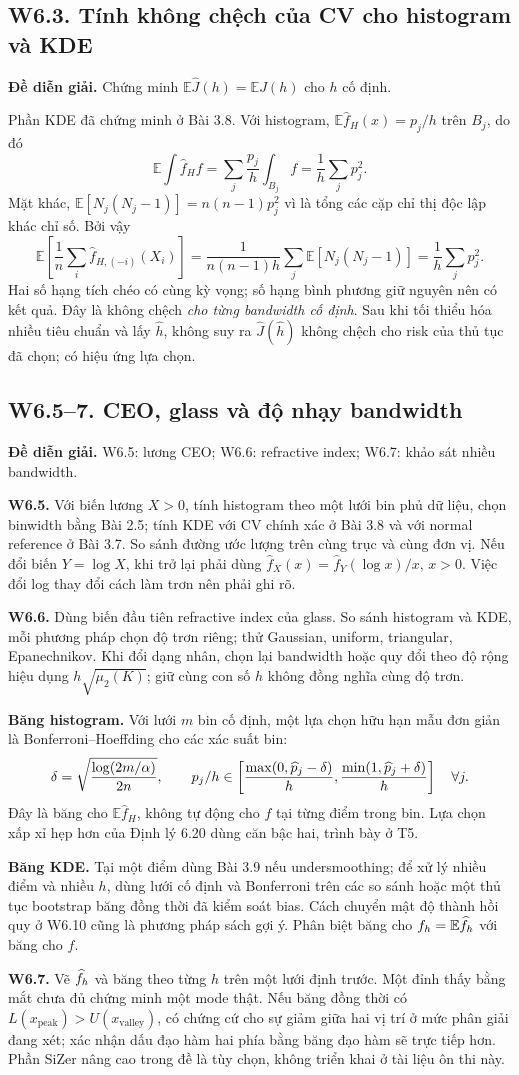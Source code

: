 \documentclass[11pt,a4paper]{article}
\newcommand{\E}{\mathbb E}\newcommand{\Pp}{\mathbb P}
\newcommand{\supp}[3]{\subsection{#1. #2}\label{s:#1}\textbf{Đề diễn giải.} #3\par}
\begin{document}
\supp{W6.3}{Tính không chệch của CV cho histogram và KDE}{Chứng minh $\E\widehat J(h)=\E J(h)$ cho $h$ cố định.}
Phần KDE đã chứng minh ở Bài 3.8. Với histogram, $\E\widehat f_H(x)=p_j/h$ trên $B_j$, do đó
\[
\E\int\widehat f_H f=\sum_j\frac{p_j}h\int_{B_j}f=\frac1h\sum_jp_j^2.
\]
Mặt khác, $\E[N_j(N_j-1)]=n(n-1)p_j^2$ vì là tổng các cặp chỉ thị độc lập khác chỉ số. Bởi vậy
\[
\E\left[\frac1n\sum_i\widehat f_{H,(-i)}(X_i)\right]
=\frac1{n(n-1)h}\sum_j\E[N_j(N_j-1)]=\frac1h\sum_jp_j^2.
\]
Hai số hạng tích chéo có cùng kỳ vọng; số hạng bình phương giữ nguyên nên có kết quả. Đây là không chệch \emph{cho từng bandwidth cố định}. Sau khi tối thiểu hóa nhiều tiêu chuẩn và lấy $\widehat h$, không suy ra $\widehat J(\widehat h)$ không chệch cho risk của thủ tục đã chọn; có hiệu ứng lựa chọn.

\supp{W6.5--7}{CEO, glass và độ nhạy bandwidth}{W6.5: lương CEO; W6.6: refractive index; W6.7: khảo sát nhiều bandwidth.}
\textbf{W6.5.} Với biến lương $X>0$, tính histogram theo một lưới bin phủ dữ liệu, chọn binwidth bằng Bài 2.5; tính KDE với CV chính xác ở Bài 3.8 và với normal reference ở Bài 3.7. So sánh đường ước lượng trên cùng trục và cùng đơn vị. Nếu đổi biến $Y=\log X$, khi trở lại phải dùng
$\widehat f_X(x)=\widehat f_Y(\log x)/x$, $x>0$. Việc đổi log thay đổi cách làm trơn nên phải ghi rõ.

\textbf{W6.6.} Dùng biến đầu tiên refractive index của glass. So sánh histogram và KDE, mỗi phương pháp chọn độ trơn riêng; thử Gaussian, uniform, triangular, Epanechnikov. Khi đổi dạng nhân, chọn lại bandwidth hoặc quy đổi theo độ rộng hiệu dụng $h\sqrt{\mu_2(K)}$; giữ cùng con số $h$ không đồng nghĩa cùng độ trơn.

\textbf{Băng histogram.} Với lưới $m$ bin cố định, một lựa chọn hữu hạn mẫu đơn giản là Bonferroni--Hoeffding cho các xác suất bin:
\[
\delta=\sqrt{\frac{\log(2m/\alpha)}{2n}},\qquad
p_j/h\in\left[\frac{\max(0,\widehat p_j-\delta)}h,\frac{\min(1,\widehat p_j+\delta)}h\right]\quad\forall j.
\]
Đây là băng cho $\E\widehat f_H$, không tự động cho $f$ tại từng điểm trong bin. Lựa chọn xấp xỉ hẹp hơn của Định lý 6.20 dùng căn bậc hai, trình bày ở T5.

\textbf{Băng KDE.} Tại một điểm dùng Bài 3.9 nếu undersmoothing; để xử lý nhiều điểm và nhiều $h$, dùng lưới cố định và Bonferroni trên các so sánh hoặc một thủ tục bootstrap băng đồng thời đã kiểm soát bias. Cách chuyển mật độ thành hồi quy ở W6.10 cũng là phương pháp sách gợi ý. Phân biệt băng cho $f_h=\E\fh$ với băng cho $f$.

\textbf{W6.7.} Vẽ $\widehat f_h$ và băng theo từng $h$ trên một lưới định trước. Một đỉnh thấy bằng mắt chưa đủ chứng minh một mode thật. Nếu băng đồng thời có $L(x_\mathrm{peak})>U(x_\mathrm{valley})$, có chứng cứ cho sự giảm giữa hai vị trí ở mức phân giải đang xét; xác nhận dấu đạo hàm hai phía bằng băng đạo hàm sẽ trực tiếp hơn. Phần SiZer nâng cao trong đề là tùy chọn, không triển khai ở tài liệu ôn thi này.
\end{document}
